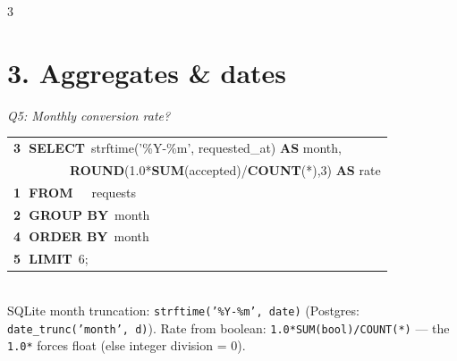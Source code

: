 \documentclass[landscape,letterpaper,9pt]{extarticle}
\begin{document}
\begin{multicols*}{3}
\section*{3. Aggregates \& dates}
\textit{\scriptsize Q5: Monthly conversion rate?}\\[1pt]
\colorbox{black!4}{%
\begin{minipage}{\dimexpr\linewidth-2pt}
{\ttfamily\scriptsize
\begin{tabular}{@{}l@{}}
\textcolor{stepGroup}{\textbf{\textcircled{\scriptsize 3} SELECT}~strftime('\%Y-\%m', requested\_at) \textbf{AS} month,} \\
\textcolor{stepGroup}{~~~~~~~~~\textbf{ROUND}(1.0*\textbf{SUM}(accepted)/\textbf{COUNT}(*),3) \textbf{AS} rate} \\
\textcolor{stepFrom}{\textbf{\textcircled{\scriptsize 1} FROM}~~~requests} \\
\textcolor{stepWhere}{\textbf{\textcircled{\scriptsize 2} GROUP BY}~month} \\
\textcolor{stepHaving}{\textbf{\textcircled{\scriptsize 4} ORDER BY}~month} \\
\textcolor{stepSelect}{\textbf{\textcircled{\scriptsize 5} LIMIT}~6;} \\
\end{tabular}}
\end{minipage}}
\\[1pt]
\textcolor{cmt}{\scriptsize SQLite month truncation: \texttt{strftime('\%Y-\%m', date)} (Postgres: \texttt{date\_trunc('month', d)}). Rate from boolean: \texttt{1.0*SUM(bool)/COUNT(*)} — the \texttt{1.0*} forces float (else integer division = 0).}


\end{multicols*}
\end{document}
